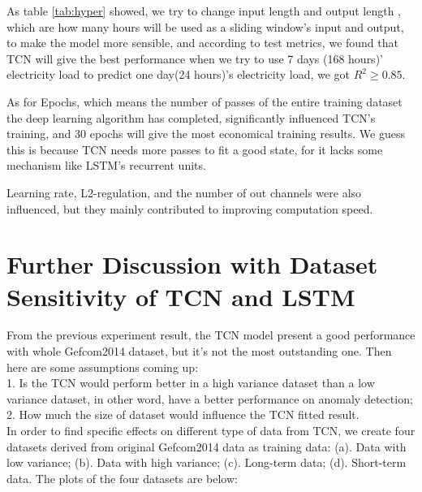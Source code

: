 As table \ref{tab:hyper} showed, we try to change input length and output length , which are how many hours will be used as a sliding window's input and output, to make the model more sensible, and according to test metrics, we found that TCN will give the best performance when we try to use 7 days (168 hours)' electricity load to predict one day(24 hours)'s electricity load, we got $R^2 \geq 0.85$.

As for Epochs, which means the number of passes of the entire training dataset the deep learning algorithm has completed, significantly influenced TCN's training, and 30 epochs will give the most economical training results. We guess this is because TCN needs more passes to fit a good state, for it lacks some mechanism like LSTM's recurrent units.

Learning rate, L2-regulation, and the number of out channels were also influenced, but they mainly contributed to improving computation speed.

\newpage
\section{Further Discussion with Dataset Sensitivity of TCN and LSTM }
From the previous experiment result, the TCN model present a good performance with whole Gefcom2014 dataset, but it’s not the most outstanding one. Then here are some assumptions coming up: \\
1. Is the TCN would perform better in a high variance dataset than a low variance dataset, in other word, have a better performance on anomaly detection; \\
2. How much the size of dataset would influence the TCN fitted result. \\

In order to find specific effects on different type of data from TCN, we create four datasets derived from original Gefcom2014 data as training data: (a). Data with low variance; (b). Data with high variance; (c).  Long-term data; (d). Short-term data. The plots of the four datasets are below:

